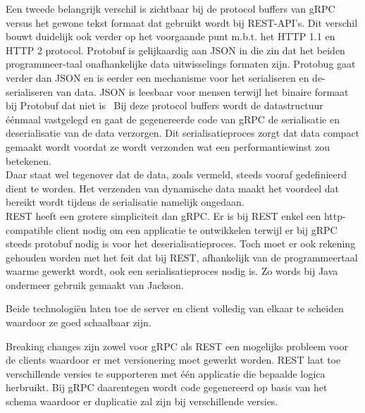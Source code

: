 Een tweede belangrijk verschil is zichtbaar bij de protocol buffers van gRPC versus het gewone tekst formaat dat gebruikt wordt bij REST-API's.
Dit verschil bouwt duidelijk ook verder op het voorgaande punt m.b.t. het HTTP 1.1 en HTTP 2 protocol.
Protobuf is gelijkaardig aan JSON in die zin dat het beiden programmeer-taal onafhankelijke data uitwisselings formaten zijn.
Protobug gaat verder dan JSON en is eerder een mechanisme voor het serialiseren en de-serialiseren van data.
JSON is leesbaar voor mensen terwijl het binaire formaat bij Protobuf dat niet is~\parencite{json}
Bij deze protocol buffers wordt de datastructuur \'e\'enmaal vastgelegd en gaat de gegenereerde code van gRPC de serialisatie en deserialisatie van de data verzorgen.
Dit serialisatieproces zorgt dat data compact gemaakt wordt voordat ze wordt verzonden wat een performantiewinst zou betekenen.\newline
~\autocite{googleprotobufguide}\\

Daar staat wel tegenover dat de data, zoals vermeld, steeds vooraf gedefinieerd dient te worden.
Het verzenden van dynamische data maakt het voordeel dat bereikt wordt tijdens de serialisatie namelijk ongedaan.\\

REST heeft een grotere simpliciteit dan gRPC. Er is bij REST enkel een http-compatible client nodig om een applicatie te ontwikkelen terwijl
er bij gRPC steeds protobuf nodig is voor het deserialisatieproces. Toch moet er ook rekening gehouden worden met het feit dat bij REST,
afhankelijk van de programmeertaal waarme gewerkt wordt, ook een serialisatieproces nodig is. Zo words bij Java ondermeer gebruik gemaakt van Jackson.\newline
~\autocite{jackson}

Beide technologi\"en laten toe de server en client volledig van elkaar te scheiden waardoor ze goed schaalbaar zijn.

Breaking changes zijn zowel voor gRPC als REST een mogelijks probleem voor de clients waardoor er met versionering moet gewerkt worden.
REST laat toe verschillende versies te supporteren met \'e\'en applicatie die bepaalde logica herbruikt. Bij gRPC daarentegen wordt code gegenereerd op basis van
het schema waardoor er duplicatie zal zijn bij verschillende versies.\newline
~\autocite{grpcversion}

